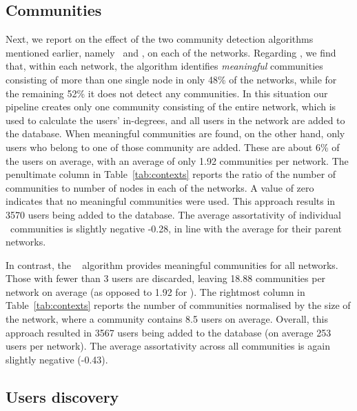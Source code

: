 \documentclass[runningheads]{llncs}
\begin{document}
\subsection{Communities}  \label{sec:communities}

Next, we report on the effect of the two community detection algorithms mentioned earlier, namely \demon~and \infomap, on each of the networks. 
%
Regarding \demon, we find that, within each network, the algorithm  identifies \textit{meaningful} communities consisting of more than one single node in only 48\% of the networks, while for the remaining 52\% 
it does not detect any communities.
In this situation our pipeline creates only one community consisting of the entire network, which is used to calculate the users' in-degrees, and all users in the network are added to the database.
%
When meaningful communities are found, on the other hand, only users who belong to one of those community are added. 
These are about 6\% of the users on average, with an average of only 1.92 communities per network.
The penultimate column in Table~\ref{tab:contexts} reports the ratio of the number of communities to number of nodes in each of the networks. 
A value of zero indicates that no meaningful communities were used.
%
This approach results in 3570 users being added to the database.
The average assortativity of individual \demon~communities is slightly negative -0.28, in line with the average for their parent networks.

In contrast, the \infomap~ algorithm provides meaningful communities for all networks.
Those with fewer than 3 users are discarded, leaving  18.88 communities per network on average (as opposed to 1.92 for \demon).
The rightmost column in Table~\ref{tab:contexts} reports the number of communities normalised by the size of the network, where a community contains 8.5 users on average. 
Overall, this approach resulted in 3567 users being added to the database (on average 253 users per network).
The average assortativity across all communities is again slightly negative (-0.43).





\subsection{Users discovery}  \label{sec:users}
\end{document}
